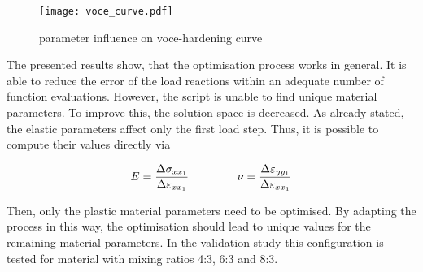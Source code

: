 \begin{figure}[H]
    \centering
    \texttt{[image: voce\_curve.pdf]}
    \caption{parameter influence on voce-hardening curve}
    \label{fig:voceCurve}
\end{figure}

The presented results show, that the optimisation process works in general. It is able to reduce the error of the load reactions within an adequate number of function evaluations. However, the script is unable to find unique material parameters. To improve this, the solution space is decreased. As already stated, the elastic parameters affect only the first load step. Thus, it is possible to compute their values directly via

\begin{gather}\label{eq: EandNu}
    E = \frac{\Delta\sigma_{xx_1}}{\Delta\varepsilon_{xx_1}} \hspace{1.5cm}
    \nu = \frac{\Delta\varepsilon_{yy_1}}{\Delta\varepsilon_{xx_1}}
\end{gather}
    
Then, only the plastic material parameters need to be optimised. By adapting the process in this way, the optimisation should lead to unique values for the remaining material parameters. In the validation study this configuration is tested for material with mixing ratios 4:3, 6:3 and 8:3. \\
















